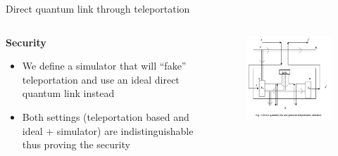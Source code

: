 \documentclass[final]{beamer}
\newlength{\twocolwid}
\begin{document}
\begin{frame}[t]
\begin{columns}[t]
\begin{column}{\twocolwid}
\begin{columns}[t,totalwidth=\twocolwid]
\begin{column}{\twocolwid}
\begin{block}{Direct quantum link through teleportation}
\begin{columns}
    \begin{column}{.60 \textwidth} %
        \centering
       \textbf{Security}\\[.2cm]
       \begin{itemize}
           \item We define a simulator that will “fake” teleportation and use an ideal direct quantum link instead
          \item Both settings (teleportation based and ideal + simulator) are indistinguishable thus proving the security
       \end{itemize}
    \end{column} 
    \hfill%
    \begin{column}{.40\textwidth} %
       \centering
       \begin{figure}
         \includegraphics[width=0.95\linewidth]{direct_quantum_link_simulator.jpg}
       \end{figure}
    \end{column}%
  \end{columns}

\end{block}


\end{column} %


\end{columns}
\end{column}
\end{columns}
\end{frame}
\end{document}
